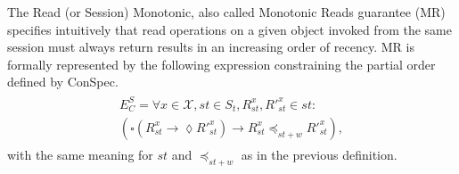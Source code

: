 \documentclass[journal,compsoc]{IEEEtran}
\begin{document}
The Read (or Session) Monotonic, also called Monotonic Reads guarantee (MR) specifies intuitively that read operations on a given object invoked from the same session must always return results in an increasing order of recency.   MR is formally represented by the following expression constraining the partial order defined by ConSpec.
\begin{align}\label{eqn:MR}
\begin{split}
    E^S_C =  \forall x \in \mathcal{X}, \mathit{st} \in \mathit{S_t}, R_\mathit{st}^x, R'^x_\mathit{st} \in \mathit{st}: \\
   \left( \square \left( R_\mathit{st}^x \rightarrow \lozenge R'^{x}_\mathit{st} \right)
 \rightarrow R_\mathit{st}^x \preccurlyeq_{\mathit{st}+w} R'^{x}_\mathit{st} \right),
\end{split}
\end{align} with the same meaning for $\mathit{st}$ and $\preccurlyeq_{\mathit{st}+w}$ as in the previous definition.
\end{document}
